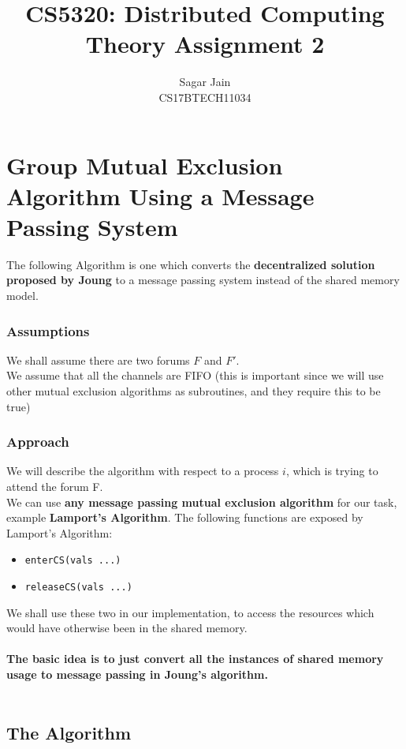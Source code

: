 \documentclass[12pt]{article}
\begin{document}
\title{CS5320: Distributed Computing\\Theory Assignment 2}
\author{Sagar Jain\\CS17BTECH11034}
\maketitle
\section{Group Mutual Exclusion Algorithm Using a Message Passing System}
The following Algorithm is one which converts the \textbf{decentralized solution proposed by Joung} to a message passing system instead of the shared memory model.

\subsubsection{Assumptions}
We shall assume there are two forums $F$ and $F'$.\\
We assume that all the channels are FIFO (this is important since we will use other mutual exclusion algorithms as subroutines, and they require this to be true)
\subsubsection{Approach}
We will describe the algorithm with respect to a process $i$, which is trying to attend the forum F.\\
We can use \textbf{any message passing mutual exclusion algorithm }for our task, example \textbf{Lamport's Algorithm}.
The following functions are exposed by Lamport's Algorithm:
\begin{itemize}
\item \texttt{enterCS(vals ...)}
\item \texttt{releaseCS(vals ...)}
\end{itemize}
We shall use these two in our implementation, to access the resources which would have otherwise been in the shared memory.\\\\
\textbf{The basic idea is to just convert all the instances of shared memory usage to message passing in Joung's algorithm.}\\\\

\subsection{The Algorithm}
\end{document}
